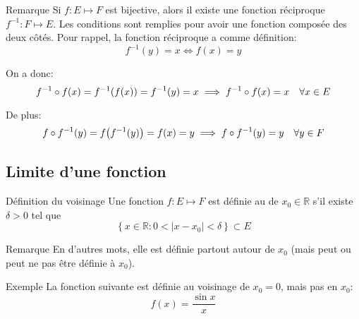 \documentclass[a4paper]{article}
\begin{document}
\begin{parag}{Remarque}
        Si $f : E\mapsto F$ est bijective, alors il existe une fonction réciproque $f^{-1} : F \mapsto E$. Les conditions sont remplies pour avoir une fonction composée des deux côtés. Pour rappel, la fonction réciproque a comme définition:
        \[f^{-1}\left(y\right) = x \iff f\left(x\right) = y\]

        On a donc:
        \[f^{-1} \circ f\left(x\right) = f^{-1}\left(f\left(x\right)\right) = f^{-1}\left(y\right) = x \implies f^{-1} \circ f\left(x\right) = x \mathspace \forall x \in E\]

        De plus:
        \[f \circ f^{-1}\left(y\right) = f\left(f^{-1}\left(y\right)\right) = f\left(x\right) = y \implies f \circ f^{-1}\left(y\right) = y \mathspace \forall y \in F\]
\end{parag}

    \subsection{Limite d'une fonction}
\begin{parag}{Définition du voisinage}
        Une fonction $f : E \mapsto F$ est définie au  de $x_0 \in \mathbb{R}$ s'il existe $\delta > 0$ tel que
        \[\left\{x \in \mathbb{R} : 0 < \left|x - x_0\right| < \delta\right\} \subset E\]

    \begin{subparag}{Remarque}
            En d'autres mots, elle est définie partout autour de $x_0$ (mais peut ou peut ne pas être définie à $x_0$).
    \end{subparag}
\end{parag}

\begin{parag}{Exemple}
        La fonction suivante est définie au voisinage de $x_0 = 0$, mais pas en $x_0$:
        \[f\left(x\right) = \frac{\sin x}{x}\]

\end{parag}
\end{document}
